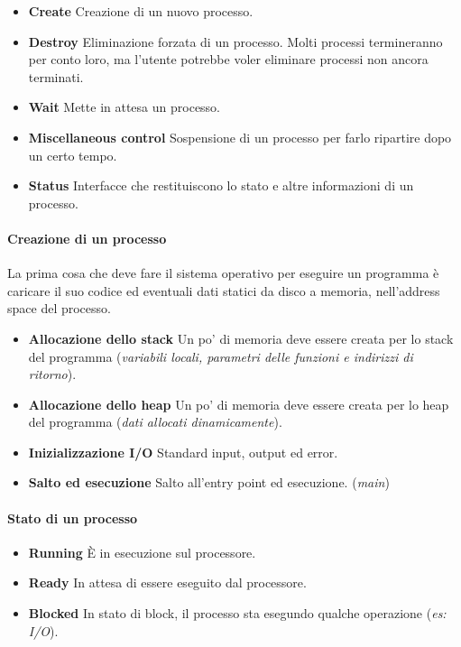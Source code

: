 \documentclass[12pt, twoside, letterpaper]{article}
\begin{document}
				\begin{itemize}
					\item \textbf{Create} Creazione di un nuovo processo.
					\item \textbf{Destroy} Eliminazione forzata di un processo. Molti processi termineranno per conto loro, ma l'utente potrebbe voler eliminare processi non ancora terminati.
					\item \textbf{Wait} Mette in attesa un processo. 
					\item \textbf{Miscellaneous control} Sospensione di un processo per farlo ripartire dopo un certo tempo.
					\item \textbf{Status} Interfacce che restituiscono lo stato e altre informazioni di un processo.
				\end{itemize}
				
				\paragraph{Creazione di un processo} La prima cosa che deve fare il sistema operativo per eseguire un programma è caricare il suo codice ed eventuali dati statici da disco a memoria, nell'address space del processo.
					\begin{itemize}
						\item \textbf{Allocazione dello stack} Un po' di memoria deve essere creata per lo stack del programma 	(\textit{variabili locali, parametri delle funzioni e indirizzi di ritorno}).	
						\item \textbf{Allocazione dello heap}  Un po' di memoria deve essere creata per lo heap del programma (\textit{dati allocati dinamicamente}).
						\item \textbf{Inizializzazione I/O} Standard input, output ed error.
						\item \textbf{Salto ed esecuzione} Salto all'entry point ed esecuzione. (\textit{main}) 
					\end{itemize}
					
				\paragraph{Stato di un processo}		
					\begin{itemize}
						\item \textbf{Running} È in esecuzione sul processore.
						\item \textbf{Ready} In attesa di essere eseguito dal processore.
						\item \textbf{Blocked} In stato di block, il processo sta esegundo qualche operazione (\textit{es: I/O}).
					\end{itemize}
					
\end{document}
